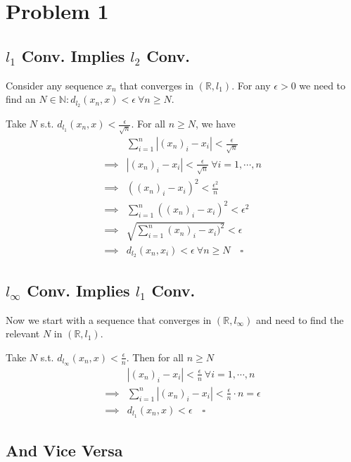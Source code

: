 \documentclass[12pt]{article}
\newcommand{\N}{\mathbb{N}}
\newcommand{\R}{\mathbb{R}}
\begin{document}
\section{Problem 1}

\subsection{\texorpdfstring{$l_1$}{L1} Conv. Implies \texorpdfstring{$l_2$}{L1} Conv.}

Consider any sequence $x_n$ that converges in $(\R, l_1)$.
For any $\epsilon > 0$ we need to find an $N \in \N: d_{l_2}(x_n, x) < \epsilon\ \forall n \ge N$.

Take $N$ s.t. $d_{l_1}(x_n, x) < \frac{\epsilon}{\sqrt{n}}$.
For all $n \ge N$, we have
\begin{align*}
    & \sum_{i=1}^{n} |(x_n)_i-x_i| < \frac{\epsilon}{\sqrt{n}} \\
    \implies{} & |(x_n)_i-x_i| < \frac{\epsilon}{\sqrt{n}}\ \forall i=1, \cdots, n \\
    \implies{} & ((x_n)_i-x_i)^2 < \frac{\epsilon^2}{n} \\
    \implies{} & \sum_{i=1}^{n} ((x_n)_i-x_i)^2 < \epsilon^2 \\
    \implies{} & \sqrt{\sum_{i=1}^{n} (x_n)_i-x_i)^2} < \epsilon \\
    \implies{} & d_{l_2}(x_n, x_i) < \epsilon\ \forall n \ge N\quad\square
\end{align*}

\subsection{\texorpdfstring{$l_\infty$}{L\_inf} Conv. Implies \texorpdfstring{$l_1$}{L1} Conv.}

Now we start with a sequence that converges in $(\R, l_\infty)$
and need to find the relevant $N$ in $(\R, l_1)$.

Take $N$ s.t. $d_{l_\infty}(x_n, x) < \frac{\epsilon}{n}$.
Then for all $n \ge N$
\begin{align*}
    & |(x_n)_i-x_i| < \frac{\epsilon}{n}\ \forall i=1, \cdots, n \\
    \implies{} & \sum_{i=1}^{n} |(x_n)_i-x_i| < \frac{\epsilon}{n} \cdot n = \epsilon \\
    \implies{} & d_{l_1}(x_n, x) < \epsilon\quad\square
\end{align*}

\subsection{And Vice Versa}
\end{document}
